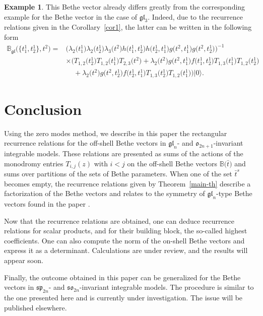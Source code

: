 \documentclass[10pt,a4paper]{amsart}
\newcommand{\bt}{{\bar t}}
\theoremstyle{definition}
\newtheorem{exam}[thm]{Example}
\def\BB{{\mathbb{B}}}
\def\BBg{\mathbb{B}_{\mathfrak{gl}}}
\begin{document}
\begin{exam}
This Bethe vector already differs greatly from the corresponding example for the
Bethe vector in the case of $\mathfrak{gl}_3$. Indeed, due to the
recurrence relations given in the Corollary~{\rm\ref{cor1}}, the latter can be written
in the following form
\begin{align*}
\BBg\bigl(\bigl\{t^1_1,t^1_2\bigr\},t^2\bigr)={}&\bigl({\lambda_2\bigl(t^1_1\bigr) \lambda_2\bigl(t^1_2\bigr)
\lambda_3\bigl(t^2\bigr)}
{h\bigl(t^1_1,t^1_2\bigr) h\bigl(t^1_2,t^1_1\bigr)} {g\bigl(t^2,t^1_1\bigr) g\bigl(t^2,t^1_2\bigr)}\bigr)^{-1}\\
&\times\bigl(T_{1,2}\bigl(t^1_2\bigr) T_{1,2}\bigl(t^1_1\bigr) T_{2,3}\bigl(t^2\bigr) +\lambda_2\bigl(t^2\bigr) g\bigl(t^2,t^1_1\bigr) f\bigl(t^1_1,t^1_2\bigr) T_{1,3}\bigl(t^1_1\bigr)
T_{1,2}\bigl(t^1_2\bigr)\\
&\phantom{\times}{}+\lambda_2\bigl(t^2\bigr) g\bigl(t^2,t^1_2\bigr) f\bigl(t^1_2,t^1_1\bigr) T_{1,3}\bigl(t^1_2\bigr) T_{1,2}\bigl(t^1_1\bigr)
\bigr) |0\rangle .
\end{align*}
\end{exam}


\section{Conclusion}\label{conclu}

Using the zero modes method, we describe in this paper the rectangular recurrence
relations for the off-shell Bethe vectors in $\mathfrak{gl}_n$- and
$\mathfrak{o}_{2n+1}$-invariant integrable models. These relations
are presented as sums of the actions of the monodromy entries
$T_{i,j}(z)$ with $i<j$ on the off-shell Bethe vectors $\BB\bigl(\bt\bigr)$ and sums
over partitions of the sets of Bethe parameters. When one of the
set $\bt^s$ becomes empty, the recurrence relations given by
Theorem~\ref{main-th} describe a factorization of the Bethe vectors
and relates to the symmetry of $\mathfrak{gl}_n$-type Bethe vectors found in the
paper \cite{LPRS-New}.

Now that the recurrence relations are obtained, one can deduce recurrence relations for scalar products, and for their building block, the so-called highest coefficients. One can also compute the norm of the on-shell Bethe vectors and express it as a determinant. Calculations are under review, and the results will appear soon.

Finally, the outcome obtained in this paper can be generalized for the Bethe vectors
in $\mathfrak{sp}_{2n}$- and $\mathfrak{so}_{2n}$-invariant integrable models. The procedure is similar to the one presented here and is
currently under investigation.
The issue will be published elsewhere.
\end{document}
